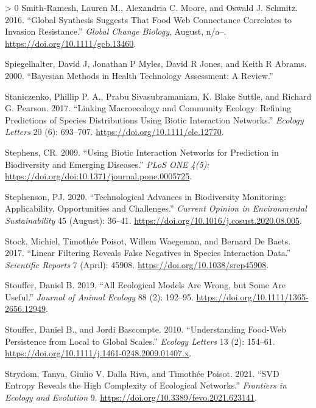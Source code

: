 \documentclass[10pt,oneside]{article}
\newlength{\cslhangindent}
\newenvironment{CSLReferences}[3] %
 {%
  \setlength{\parindent}{0pt}
  \ifodd #1 \everypar{\setlength{\hangindent}{\cslhangindent}}\ignorespaces\fi
  \ifnum #2 > 0
  \setlength{\parskip}{#2\baselineskip}
  \fi
 }%
 {}
\begin{document}
\begin{CSLReferences}{1}{0}
\leavevmode\hypertarget{ref-Smith-Ramesh2016GloSyn}{}%
Smith-Ramesh, Lauren M., Alexandria C. Moore, and Oswald J. Schmitz.
2016. {``Global Synthesis Suggests That Food Web Connectance Correlates
to Invasion Resistance.''} \emph{Global Change Biology}, August, n/a--.
\url{https://doi.org/10.1111/gcb.13460}.

\leavevmode\hypertarget{ref-Spiegelhalter2000BayMet}{}%
Spiegelhalter, David J, Jonathan P Myles, David R Jones, and Keith R
Abrams. 2000. {``Bayesian Methods in Health Technology Assessment: A
Review.''}

\leavevmode\hypertarget{ref-Staniczenko2017LinMac}{}%
Staniczenko, Phillip P. A., Prabu Sivasubramaniam, K. Blake Suttle, and
Richard G. Pearson. 2017. {``Linking Macroecology and Community Ecology:
Refining Predictions of Species Distributions Using Biotic Interaction
Networks.''} \emph{Ecology Letters} 20 (6): 693--707.
\url{https://doi.org/10.1111/ele.12770}.

\leavevmode\hypertarget{ref-Stephens2009UsiBio}{}%
Stephens, CR. 2009. {``Using Biotic Interaction Networks for Prediction
in Biodiversity and Emerging Diseases.''} \emph{PLoS ONE 4(5):}
\url{https://doi.org/doi:10.1371/journal.pone.0005725}.

\leavevmode\hypertarget{ref-Stephenson2020TecAdv}{}%
Stephenson, PJ. 2020. {``Technological Advances in Biodiversity
Monitoring: Applicability, Opportunities and Challenges.''}
\emph{Current Opinion in Environmental Sustainability} 45 (August):
36--41. \url{https://doi.org/10.1016/j.cosust.2020.08.005}.

\leavevmode\hypertarget{ref-Stock2017LinFil}{}%
Stock, Michiel, Timothée Poisot, Willem Waegeman, and Bernard De Baets.
2017. {``Linear Filtering Reveals False Negatives in Species Interaction
Data.''} \emph{Scientific Reports} 7 (April): 45908.
\url{https://doi.org/10.1038/srep45908}.

\leavevmode\hypertarget{ref-Stouffer2019AllEco}{}%
Stouffer, Daniel B. 2019. {``All Ecological Models Are Wrong, but Some
Are Useful.''} \emph{Journal of Animal Ecology} 88 (2): 192--95.
\url{https://doi.org/10.1111/1365-2656.12949}.

\leavevmode\hypertarget{ref-Stouffer2010UndFoo}{}%
Stouffer, Daniel B., and Jordi Bascompte. 2010. {``Understanding
Food-Web Persistence from Local to Global Scales.''} \emph{Ecology
Letters} 13 (2): 154--61.
\url{https://doi.org/10.1111/j.1461-0248.2009.01407.x}.

\leavevmode\hypertarget{ref-Strydom2021SvdEnt}{}%
Strydom, Tanya, Giulio V. Dalla Riva, and Timothée Poisot. 2021. {``SVD
Entropy Reveals the High Complexity of Ecological Networks.''}
\emph{Frontiers in Ecology and Evolution} 9.
\url{https://doi.org/10.3389/fevo.2021.623141}.


\end{CSLReferences}
\end{document}
